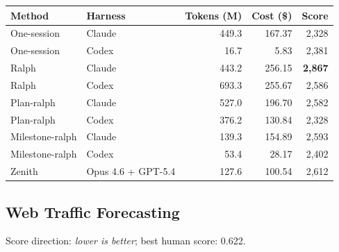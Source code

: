 \documentclass[11pt,a4paper]{article}
\newcommand{\code}[1]{#1}
\begin{document}
\noindent\begin{tabular}{@{}llrrr@{}}
\toprule
\rowcolor{tablehead}\textbf{\color{white}Method} & \textbf{\color{white}Harness} & \textbf{\color{white}Tokens (M)} & \textbf{\color{white}Cost (\$)} & \textbf{\color{white}Score} \\
\midrule
\code{One-session}    & Claude              & 449.3  & 167.37  & 2{,}328 \\
\rowcolor{tableband}
\code{One-session}    & Codex               & 16.7   & 5.83    & 2{,}381 \\
\code{Ralph}          & Claude              & 443.2  & 256.15  & \textbf{2{,}867} \\
\rowcolor{tableband}
\code{Ralph}          & Codex               & 693.3  & 255.67  & 2{,}586 \\
\code{Plan-ralph}     & Claude              & 527.0  & 196.70  & 2{,}582 \\
\rowcolor{tableband}
\code{Plan-ralph}     & Codex               & 376.2  & 130.84  & 2{,}328 \\
\code{Milestone-ralph}& Claude              & 139.3  & 154.89  & 2{,}593 \\
\rowcolor{tableband}
\code{Milestone-ralph}& Codex               & 53.4   & 28.17   & 2{,}402 \\
\code{Zenith}         & Opus 4.6 + GPT-5.4  & 127.6  & 100.54  & 2{,}612 \\
\bottomrule
\end{tabular}

\subsection*{Web Traffic Forecasting}

Score direction: \emph{lower is better}; best human score: 0.622.
\end{document}
